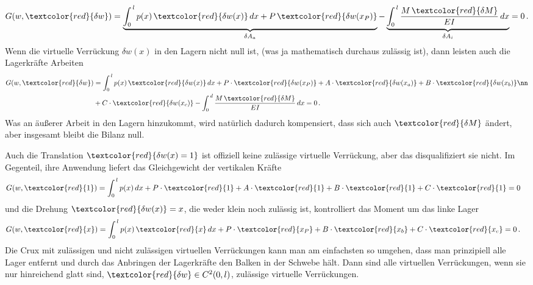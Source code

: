 \begin{align}
G(w,\textcolor{red}{\delta w}) = \underbrace{\int_{0}^{\,l} p(x)\,\textcolor{red}{\delta w(x)}\,dx + P\, \textcolor{red}{\delta w(x_P)}}_{\delta A_a} - \underbrace{\int_0^{\,l} \frac{M\, \textcolor{red}{\delta M}}{EI}\,dx}_{\delta A_i} = 0\,.
\end{align}
Wenn die virtuelle Verr\"{u}ckung $\delta w(x)$ in den Lagern nicht null ist, (was ja mathematisch  durchaus zul\"{a}ssig ist), dann leisten auch die Lagerkr\"{a}fte  Arbeiten
\begin{align}
G(w,\textcolor{red}{\delta w}) &= \int_{0}^{\,l} p(x)\,\textcolor{red}{\delta w(x)}\,dx  + P \cdot \textcolor{red}{\delta w(x_P)} + A\cdot\textcolor{red}{\delta w(x_a)} + B\cdot\textcolor{red}{\delta w(x_b) }\nn \\ &+ C\cdot\textcolor{red}{\delta w(x_c)}
 - \int_0^{\,d} \frac{M\,\textcolor{red}{ \delta M}}{EI}\,dx = 0\,.
\end{align}
Was an \"{a}u{\ss}erer Arbeit in den Lagern hinzukommt, wird nat\"{u}rlich  dadurch kompensiert, dass sich auch $\textcolor{red}{\delta M} $ \"{a}ndert, aber insgesamt bleibt die Bilanz null.


Auch die Translation $\textcolor{red}{\delta w(x) = 1}$ ist offiziell keine zul\"{a}ssige virtuelle Verr\"{u}ckung, aber das disqualifiziert sie nicht. Im Gegenteil, ihre Anwendung liefert das  Gleichgewicht der vertikalen Kr\"{a}fte
\begin{align}
G(w,\textcolor{red}{1}) &= \int_{0}^{\,l} p(x)\,dx + P \cdot \textcolor{red}{1}  + A\cdot \textcolor{red}{1} + B\cdot \textcolor{red}{1} + C\cdot \textcolor{red}{1}  = 0
\end{align}
und die Drehung $\textcolor{red}{\delta w(x)} = x$, die weder klein noch zul\"{a}ssig ist, kontrolliert das Moment um das linke Lager
\begin{align}
G(w,\textcolor{red}{x}) &=\int_{0}^{\,l} p(x)\,\textcolor{red}{x}\,dx + P \cdot \textcolor{red}{x_P} + B\cdot \textcolor{red}{x_b} + C\cdot \textcolor{red}{x_c}  = 0\,.
\end{align}
Die Crux mit zul\"{a}ssigen und nicht zul\"{a}ssigen virtuellen Verr\"{u}ckungen kann man am einfachsten so umgehen, dass man prinzipiell alle Lager entfernt und durch das Anbringen der Lagerkr\"{a}fte den Balken in der Schwebe h\"{a}lt. Dann sind alle virtuellen Verr\"{u}ckungen, wenn sie nur hinreichend glatt sind,  $\textcolor{red}{\delta w} \in C^2(0,l) $, zul\"{a}ssige virtuelle Verr\"{u}ckungen.\\


